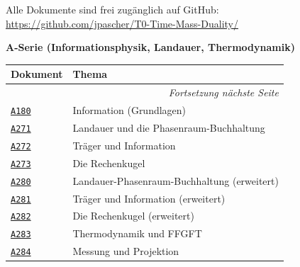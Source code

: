 
Alle Dokumente sind frei zugänglich auf GitHub:\\
\url{https://github.com/jpascher/T0-Time-Mass-Duality/}

\vspace{0.5em}

\noindent\textbf{A-Serie (Informationsphysik, Landauer, Thermodynamik)}

\vspace{0.3em}
{\scriptsize
\setlength{\LTleft}{0pt}
\setlength{\LTright}{0pt}
\begin{longtable}{@{}p{}p{}@{}}
\toprule
\textbf{Dokument} & \textbf{Thema} \\
\midrule
\endhead
\midrule
\multicolumn{2}{r}{\scriptsize\itshape Fortsetzung nächste Seite} \\
\endfoot
\bottomrule
\endlastfoot
\href{https://github.com/jpascher/T0-Time-Mass-Duality/blob/main/A_Serie_Export/pdf/A180_Information_De.pdf}{\texttt{A180}} &
  Information (Grundlagen) \\
\href{https://github.com/jpascher/T0-Time-Mass-Duality/blob/main/A_Serie_Export/pdf/A271_Landauer_De.pdf}{\texttt{A271}} &
  Landauer und die Phasenraum-Buchhaltung \\
\href{https://github.com/jpascher/T0-Time-Mass-Duality/blob/main/A_Serie_Export/pdf/A272_Traeger_und_Information_De.pdf}{\texttt{A272}} &
  Träger und Information \\
\href{https://github.com/jpascher/T0-Time-Mass-Duality/blob/main/A_Serie_Export/pdf/A273_Die_Rechenkugel_De.pdf}{\texttt{A273}} &
  Die Rechenkugel \\
\href{https://github.com/jpascher/T0-Time-Mass-Duality/blob/main/A_Serie_Export/pdf/A280_Landauer_Phasenraum_Buchhaltung_De.pdf}{\texttt{A280}} &
  Landauer-Phasenraum-Buchhaltung (erweitert) \\
\href{https://github.com/jpascher/T0-Time-Mass-Duality/blob/main/A_Serie_Export/pdf/A281_Traeger_und_Information_De.pdf}{\texttt{A281}} &
  Träger und Information (erweitert) \\
\href{https://github.com/jpascher/T0-Time-Mass-Duality/blob/main/A_Serie_Export/pdf/A282_Die_Rechenkugel_De.pdf}{\texttt{A282}} &
  Die Rechenkugel (erweitert) \\
\href{https://github.com/jpascher/T0-Time-Mass-Duality/blob/main/A_Serie_Export/pdf/A283_Thermodynamik_FFGFT_De.pdf}{\texttt{A283}} &
  Thermodynamik und FFGFT \\
\href{https://github.com/jpascher/T0-Time-Mass-Duality/blob/main/A_Serie_Export/pdf/A284_Messung_Projektion_De.pdf}{\texttt{A284}} &
  Messung und Projektion \\
\end{longtable}
}

